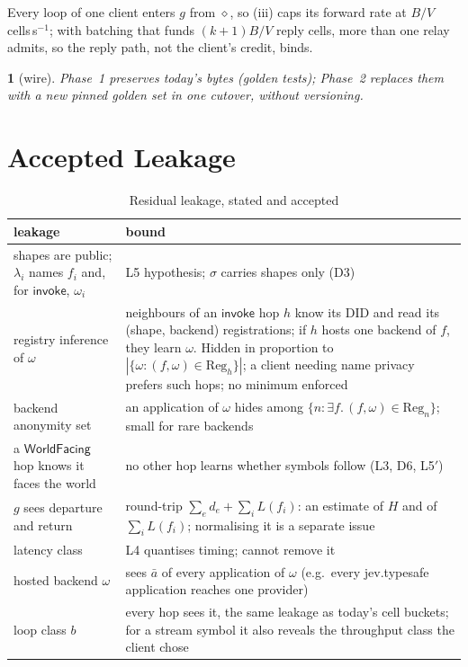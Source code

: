 \documentclass[journal]{IEEEtran}
\newcommand{\namedhead}{}
\newtheorem*{namedenv}{\namedhead}
\newenvironment{lawL}[2]{\renewcommand{\namedhead}{Law #1}%
  \begin{namedenv}[#2]}{\end{namedenv}}
\newcommand{\WF}{\mathsf{WorldFacing}}
\newcommand{\cl}{\diamond}
\DeclareRobustCommand{\code}[1]{{\ttfamily\renewcommand{\_}{\textunderscore\allowbreak}#1}}
\begin{document}
Every loop of one client enters $g$ from $\cl$, so (iii) caps its forward
rate at $B/V$ cells\,s$^{-1}$; with batching that funds $(k+1)B/V$ reply
cells, more than one relay admits, so the reply path, not the client's
credit, binds.

\begin{lawL}{L10}{wire}
Phase~1 preserves today's bytes (golden tests); Phase~2 replaces them with
a new pinned golden set in one cutover, without versioning.
\end{lawL}

\section{Accepted Leakage}\label{sec:leak}

\begin{table}[t]
\caption{Residual leakage, stated and accepted}
\label{tab:leak}
\centering\small
\begin{tabular}{@{}>{\raggedright\arraybackslash}p{}>{\raggedright\arraybackslash}p{}@{}}
\toprule
leakage & bound \\
\midrule
shapes are public; $\lambda_i$ names $f_i$ and, for $\mathsf{invoke}$, $\omega_i$ & L5 hypothesis; $\sigma$ carries shapes only (D3) \\
registry inference of $\omega$ & neighbours of an $\mathsf{invoke}$ hop $h$ know its DID and read its (shape, backend) registrations; if $h$ hosts one backend of $f$, they learn $\omega$.  Hidden in proportion to $|\{\omega:(f,\omega)\in\mathrm{Reg}_h\}|$; a client needing name privacy prefers such hops; no minimum enforced \\
backend anonymity set & an application of $\omega$ hides among $\{n:\exists f.\,(f,\omega)\in\mathrm{Reg}_n\}$; small for rare backends \\
a $\WF$ hop knows it faces the world & no other hop learns whether symbols follow (L3, D6, L5$'$) \\
$g$ sees departure and return & round-trip $\sum_e d_e+\sum_i L(f_i)$: an estimate of $H$ and of $\sum_i L(f_i)$; normalising it is a separate issue \\
latency class & L4 quantises timing; cannot remove it \\
hosted backend $\omega$ & sees $\bar a$ of every application of $\omega$ (e.g.\ every \code{jev.typesafe} application reaches one provider) \\
loop class $b$ & every hop sees it, the same leakage as today's cell buckets; for a stream symbol it also reveals the throughput class the client chose \\

\end{tabular}
\end{table}
\end{document}
